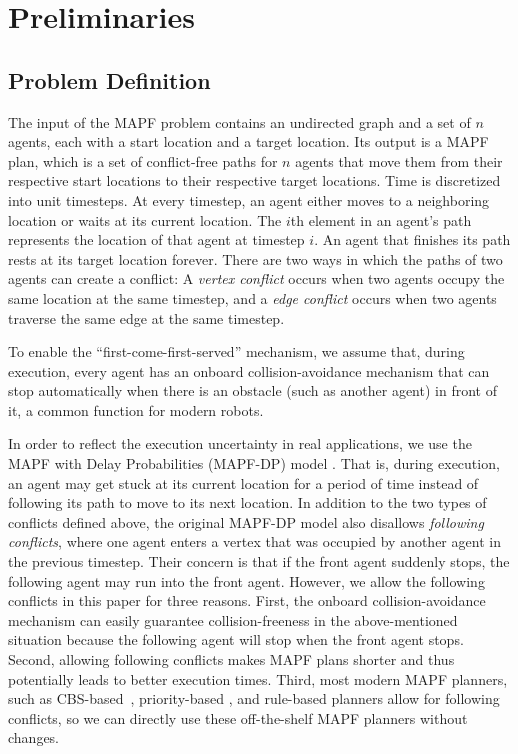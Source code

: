 \documentclass[letterpaper]{article}
\theoremstyle{definition}
\begin{document}
\section{Preliminaries}
\subsection{Problem Definition}
The input of the MAPF problem \cite{stern_multi-agent_2021} contains an undirected graph and a set of $n$ agents, each with a start location and a target location. Its output is a MAPF plan, which is a set of conflict-free paths for $n$ agents that move them from their respective start locations to their respective target locations. Time is discretized into unit timesteps. At every timestep, an agent either moves to a neighboring location or waits at its current location. The $i$th element in an agent's path represents the location of that agent at timestep $i$. An agent that finishes its path rests at its target location forever. There are two ways in which the paths of two agents can create a conflict: A \emph{vertex conflict} occurs when two agents occupy the same location at the same timestep, and a \emph{edge conflict} occurs when two agents traverse the same edge at the same timestep.


To enable the ``first-come-first-served'' mechanism, we assume that, during execution, every agent has an onboard collision-avoidance mechanism that can stop automatically when there is an obstacle (such as another agent) in front of it, a common function for modern robots.

In order to reflect the execution uncertainty in real applications, we use the MAPF with Delay Probabilities (MAPF-DP) model \cite{ma_multi-agent_2017}. That is, during execution, an agent may get stuck at its current location for a period of time instead of following its path to move to its next location. In addition to the two types of conflicts defined above, the original MAPF-DP model also disallows \emph{following conflicts}, where one agent enters a vertex that was occupied by another agent in the previous timestep. Their concern is that if the front agent suddenly stops, the following agent may run into the front agent. However, we allow the following conflicts in this paper for three reasons. First, the onboard collision-avoidance mechanism can easily guarantee collision-freeness in the above-mentioned situation because the following agent will stop when the front agent stops. Second, allowing following conflicts makes MAPF plans shorter and thus potentially leads to better execution times. Third, most modern MAPF planners, such as CBS-based~\cite{sharon_conflict-based_2015,gange_lazy_2021,li_eecbs_2021}, priority-based \cite{erdmann_multiple_1986,ma_searching_2019}, and rule-based \cite{sajid_multi-agent_2021,okumura_priority_nodate} planners allow for following conflicts, so we can directly use these off-the-shelf MAPF planners without changes.
\end{document}
